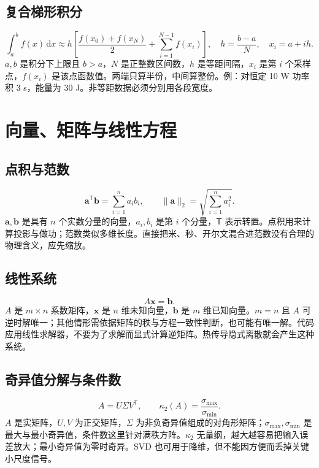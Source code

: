 \documentclass[UTF8,zihao=-4,openany,oneside,fontset=windows]{ctexbook}
\begin{document}
\subsection{复合梯形积分}
\begin{equation}\int_a^b f(x)\,\mathrm dx\approx h\left[\frac{f(x_0)+f(x_N)}2+\sum_{i=1}^{N-1}f(x_i)\right],\quad h=\frac{b-a}{N},\quad x_i=a+ih.\end{equation}
$a,b$ 是积分下上限且 $b>a$，$N$ 是正整数区间数，$h$ 是等距间隔，$x_i$ 是第 $i$ 个采样点，$f(x_i)$ 是该点函数值。两端只算半份，中间算整份。例：对恒定 10 W 功率积 3 s，能量为 30 J。非等距数据必须分别用各段宽度。

\section{向量、矩阵与线性方程}
\subsection{点积与范数}
\begin{equation}\boldsymbol a^\mathsf T\boldsymbol b=\sum_{i=1}^n a_i b_i,\qquad \|\boldsymbol a\|_2=\sqrt{\sum_{i=1}^n a_i^2}.\end{equation}
$\boldsymbol a,\boldsymbol b$ 是具有 $n$ 个实数分量的向量，$a_i,b_i$ 是第 $i$ 个分量，$\mathsf T$ 表示转置。点积用来计算投影与做功；范数类似多维长度。直接把米、秒、开尔文混合进范数没有合理的物理含义，应先缩放。
\subsection{线性系统}
\begin{equation}A\boldsymbol x=\boldsymbol b.\end{equation}
$A$ 是 $m\times n$ 系数矩阵，$\boldsymbol x$ 是 $n$ 维未知向量，$\boldsymbol b$ 是 $m$ 维已知向量。$m=n$ 且 $A$ 可逆时解唯一；其他情形需依据矩阵的秩与方程一致性判断，也可能有唯一解。代码应用线性求解器，不要为了求解而显式计算逆矩阵。热传导隐式离散就会产生这种系统。
\subsection{奇异值分解与条件数}
\begin{equation}A=U\Sigma V^\mathsf T,\qquad \kappa_2(A)=\frac{\sigma_{\max}}{\sigma_{\min}}.\end{equation}
$A$ 是实矩阵，$U,V$ 为正交矩阵，$\Sigma$ 为非负奇异值组成的对角形矩阵；$\sigma_{\max},\sigma_{\min}$ 是最大与最小奇异值，条件数这里针对满秩方阵。$\kappa_2$ 无量纲，越大越容易把输入误差放大；最小奇异值为零时奇异。SVD 也可用于降维，但不能因方便而丢掉关键小尺度信号。
\end{document}
